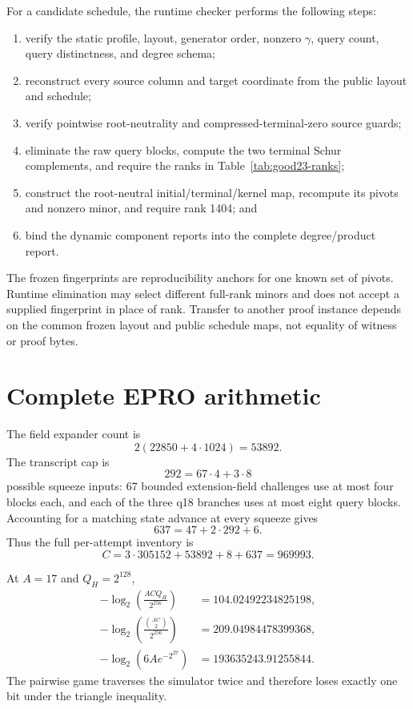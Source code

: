 For a candidate schedule, the runtime checker performs the following steps:
\begin{enumerate}
  \item verify the static profile, layout, generator order, nonzero
        \(\gamma\), query count, query distinctness, and degree schema;
  \item reconstruct every source column and target coordinate from the public
        layout and schedule;
  \item verify pointwise root-neutrality and compressed-terminal-zero source
        guards;
  \item eliminate the raw query blocks, compute the two terminal Schur
        complements, and require the ranks in
        Table~\ref{tab:good23-ranks};
  \item construct the root-neutral initial/terminal/kernel map, recompute its
        pivots and nonzero minor, and require rank 1404; and
  \item bind the dynamic component reports into the complete degree/product
        report.
\end{enumerate}
The frozen fingerprints are reproducibility anchors for one known set of
pivots.  Runtime elimination may select different full-rank minors and does
not accept a supplied fingerprint in place of rank.  Transfer to another
proof instance depends on the common frozen layout and public schedule maps,
not equality of witness or proof bytes.

\section{Complete EPRO arithmetic}
\label{app:epro-ledger}

The field expander count is
\[
 2(22850+4\cdot1024)=53892.
\]
The transcript cap is
\[
 292=67\cdot4+3\cdot8
\]
possible squeeze inputs: 67 bounded extension-field challenges use at most
four blocks each, and each of the three q18 branches uses at most eight query
blocks.  Accounting for a matching state advance at every squeeze gives
\[
 637=47+2\cdot292+6.
\]
Thus the full per-attempt inventory is
\[
 C=3\cdot305152+53892+8+637=969993.
\]

At \(A=17\) and \(Q_H=2^{128}\),
\begin{align*}
 -\log_2\left(\frac{ACQ_H}{2^{256}}\right)
    &=104.02492234825198,\\
 -\log_2\left(\frac{\binom{AC}{2}}{2^{256}}\right)
    &=209.04984478399368,\\
 -\log_2\left(6A e^{-2^{27}}\right)
    &=193635243.91255844.
\end{align*}
The pairwise game traverses the simulator twice and therefore loses exactly
one bit under the triangle inequality.

